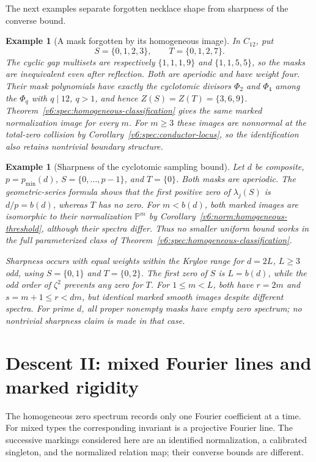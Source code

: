 \documentclass[10pt,fleqn]{article}
\numberwithin{equation}{section}
\newtheorem{example}[theorem]{Example}
\newcommand{\PP}{\mathbb P}
\begin{document}
The next examples separate forgotten necklace shape from sharpness of
the converse bound.

\begin{example}[A mask forgotten by its homogeneous image]
\label{v6:spec:forgotten-mask}
In $C_{12}$, put
\[
 S=\{0,1,2,3\},\qquad T=\{0,1,2,7\}.
\]
The cyclic gap multisets are respectively $\{1,1,1,9\}$ and
$\{1,1,5,5\}$, so the masks are inequivalent even after reflection.
Both are aperiodic and have weight four.  Their mask polynomials have
exactly the cyclotomic divisors $\Phi_2$ and $\Phi_4$ among the
$\Phi_q$ with $q\mid12$, $q>1$, and hence
$Z(S)=Z(T)=\{3,6,9\}$.  Theorem~\ref{v6:spec:homogeneous-classification}
gives the same marked normalization image for every $m$.  For $m\ge3$
these images are nonnormal at the total-zero collision by
Corollary~\ref{v6:spec:conductor-locus}, so the identification also
retains nontrivial boundary structure.
\end{example}


\begin{example}[Sharpness of the cyclotomic sampling bound]
\label{v7:spec:sharp-bound}
Let $d$ be composite, $p=p_{\min}(d)$, $S=\{0,\ldots,p-1\}$, and
$T=\{0\}$.  Both masks are aperiodic.  The geometric-series formula
shows that the first positive zero of $\lambda_j(S)$ is $d/p=b(d)$,
whereas $T$ has no zero.  For $m<b(d)$, both marked images are
isomorphic to their normalization $\PP^m$ by
Corollary~\ref{v6:norm:homogeneous-threshold}, although their spectra
differ.  Thus no smaller uniform bound works in the full parameterized
class of Theorem~\ref{v6:spec:homogeneous-classification}.

Sharpness occurs with equal weights within the Krylov range for
$d=2L$, $L\ge3$ odd, using $S=\{0,1\}$ and $T=\{0,2\}$.
The first zero of $S$ is $L=b(d)$, while the odd order of $\zeta^2$
prevents any zero for $T$.  For $1\le m<L$, both have $r=2m$ and
$s=m+1\le r<dm$, but identical marked smooth images despite different
spectra.  For prime $d$, all proper nonempty masks have empty zero
spectrum; no nontrivial sharpness claim is made in that case.
\end{example}


\section{Descent II: mixed Fourier lines and marked rigidity}
\label{v6:spec:mixed-section}

The homogeneous zero spectrum records only one Fourier coefficient at a time.  For mixed types the corresponding invariant is a projective Fourier line.  The successive markings considered here are an identified normalization, a calibrated singleton, and the normalized relation map; their converse bounds are different.
\end{document}
